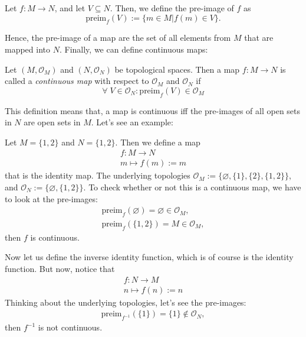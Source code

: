 \begin{definition}
    Let $f: M \longrightarrow N$, and let $V \subseteq N$. Then, we define the pre-image of $f$ as
    \[
        \text{preim}_f(V) := \{ m \in M | f(m) \in V \}.
    \]
\end{definition}

Hence, the pre-image of a map are the set of all elements from $M$ that are mapped into $N$. Finally, we can define continuous maps:

\begin{definition}
    Let $(M, \mathcal{O}_M)$ and $(N, \mathcal{O}_N)$ be topological spaces. Then a map $f : M \longrightarrow N$ is called a \emph{continuous map} with respect to $\mathcal{O}_M$ and $\mathcal{O}_N$ if
    \[
        \forall \; V \in \mathcal{O}_N : \text{preim}_f(V) \in \mathcal{O}_M
    \]
\end{definition}

This definition means that, a map is continuous iff the pre-images of all open sets in $N$ are open sets in $M$. Let's see an example:

\begin{example}
    Let $M = \{1,2\}$ and $N = \{1,2\}$. Then we define a map 
    \begin{align*}
    f:M \longrightarrow N \\
    m \longmapsto f(m) := m
    \end{align*}
    that is the identity map. The underlying topologies $\mathcal{O}_M := \{ \varnothing, \{1\}, \{2\}, \{1,2\} \}$, and $\mathcal{O}_N := \{ \varnothing, \{1,2\} \}$. To check whether or not this is a continuous map, we have to look at the pre-images:
    \begin{align*}
        \text{preim}_f(\varnothing) = \varnothing \in \mathcal{O}_M, \\
        \text{preim}_f(\{1,2\}) = M \in \mathcal{O}_M,
    \end{align*}
    then $f$ is continuous.

    Now let us define the inverse identity function, which is of course is the identity function. But now, notice that
    \begin{align*}
    f:N \longrightarrow M \\
    n \longmapsto f(n) := n
    \end{align*}
    Thinking about the underlying topologies, let's see the pre-images:
    \begin{align*}
        \text{preim}_{f^{-1}}(\{1\}) = \{1\} \notin \mathcal{O}_N,
    \end{align*}
    then $f^{-1}$ is not continuous.
    \qedwhite
\end{example}

